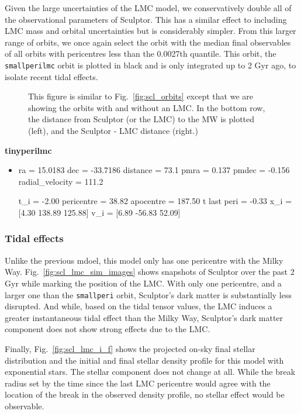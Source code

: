 Given the large uncertainties of the LMC model, we conservatively double
all of the observational parameters of Sculptor. This has a similar
effect to including LMC mass and orbital uncertainties but is
considerably simpler. From this larger range of orbits, we once again
select the orbit with the median final observables of all orbits with
pericentres less than the 0.0027th quantile. This orbit, the
\texttt{smallperilmc} orbit is plotted in black and is only integrated
up to 2 Gyr ago, to isolate recent tidal effects.

\begin{figure}
\centering
{}
\caption[Sculptor Orbits with LMC]{This figure is similar to
Fig.~\ref{fig:scl_orbits} except that we are showing the orbits with and
without an LMC. In the bottom row, the distance from Sculptor (or the
LMC) to the MW is plotted (left), and the Sculptor - LMC distance
(right.)}\label{fig:scl_lmc_orbit_effect}
\end{figure}

\textbf{tinyperilmc}

\begin{itemize}
\item
  ra = 15.0183 dec = -33.7186 distance = 73.1 pmra = 0.137 pmdec =
  -0.156 radial\_velocity = 111.2

  t\_i = -2.00 pericentre = 38.82 apocentre = 187.50 t last peri = -0.33
  x\_i = {[}4.30 138.89 125.88{]} v\_i = {[}6.89 -56.83 52.09{]}
\end{itemize}

\subsubsection{Tidal effects}\label{tidal-effects-1}

Unlike the previous mdoel, this model only has one pericentre with the
Milky Way. Fig.~\ref{fig:scl_lmc_sim_images} shows snapshots of Sculptor
over the past 2 Gyr while marking the position of the LMC. With only one
pericentre, and a larger one than the \texttt{smallperi} orbit,
Sculptor's dark matter is substantially less disrupted. And while, based
on the tidal tensor values, the LMC induces a greater instantaneous
tidal effect than the Milky Way, Sculptor's dark matter component does
not show strong effects due to the LMC.

Finally, Fig.~\ref{fig:scl_lmc_i_f} shows the projected on-sky final
stellar distribution and the initial and final stellar density profile
for this model with exponential stars. The stellar component does not
change at all. While the break radius set by the time since the last LMC
pericentre would agree with the location of the break in the observed
density profile, no stellar effect would be observable.

